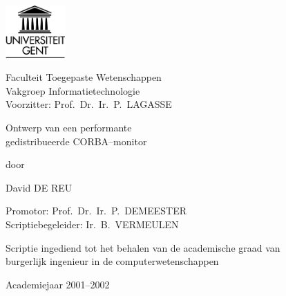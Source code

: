

\begin{titlepage}

\setlength{\hoffset}{-1in}
\setlength{\voffset}{-1in}
\setlength{\topmargin}{1.5cm}
\setlength{\headheight}{0.5cm}
\setlength{\headsep}{1cm}
\setlength{\oddsidemargin}{3cm}
\setlength{\evensidemargin}{3cm}
\setlength{\footskip}{1.5cm}
\enlargethispage{1cm}

\fontsize{12pt}{14pt}
\selectfont

\begin{center}

\includegraphics[height=2cm]{fig/ruglogo}

\vspace{0.5cm}

Faculteit Toegepaste Wetenschappen\\
Vakgroep Informatietechnologie\\
Voorzitter: Prof.~Dr.~Ir.~P.~LAGASSE

\vspace{3.5cm}

\fontsize{17.28pt}{21pt}
\selectfont

Ontwerp van een performante\\
gedistribueerde CORBA--monitor

\fontsize{12pt}{14pt}
\selectfont

\vspace{.6cm}

door 

\vspace{.4cm}

David DE REU

\vspace{3.5cm}

Promotor: Prof.~Dr.~Ir.~P.~DEMEESTER\\
Scriptiebegeleider: Ir.~B.~VERMEULEN\\

\vspace{2cm}

Scriptie ingediend tot het behalen van de academische graad van\\
burgerlijk ingenieur in de computerwetenschappen

\vspace{1cm}

Academiejaar 2001--2002

\end{center}
\end{titlepage}
